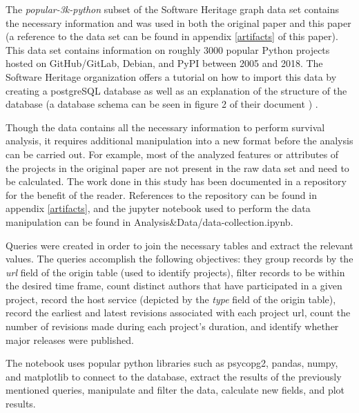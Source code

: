 \documentclass[acmconf]{acmart}
\begin{document}
The \emph{popular-3k-python} subset of the Software Heritage graph data set \cite{pietri2019software} contains the necessary information and was used in both the original paper and this paper (a reference to the data set can be found in appendix \ref{artifacts} of this paper).
This data set contains information on roughly 3000 popular Python projects hosted on GitHub/GitLab, Debian, and PyPI between 2005 and 2018.
The Software Heritage organization offers a tutorial on how to import this data by creating a postgreSQL database \cite{SQLdataset} as well as an explanation of the structure of the database (a database schema can be seen in figure 2 of their document \cite{pietri2019software}) .

Though the data contains all the necessary information to perform survival analysis, it requires additional manipulation into a new format before the analysis can be carried out. 
For example, most of the analyzed features or attributes of the projects in the original paper are not present in the raw data set and need to be calculated.
The work done in this study has been documented in a repository for the benefit of the reader.
References to the repository can be found in appendix \ref{artifacts}, and the jupyter notebook used to perform the data manipulation can be found in Analysis\&Data/data-collection.ipynb.

Queries were created in order to join the necessary tables and extract the relevant values.
The queries accomplish the following objectives: they group records by the \emph{url} field of the origin table (used to identify projects), filter records to be within the desired time frame, count distinct authors that have participated in a given project, record the host service (depicted by the \emph{type} field of the origin table), record the earliest and latest revisions associated with each project url, count the number of revisions made during each project's duration, and identify whether major releases were published.

The notebook uses popular python libraries such as psycopg2, pandas, numpy, and matplotlib to connect to the database, extract the results of the previously mentioned queries, manipulate and filter the data, calculate new fields, and plot results. 
\end{document}

